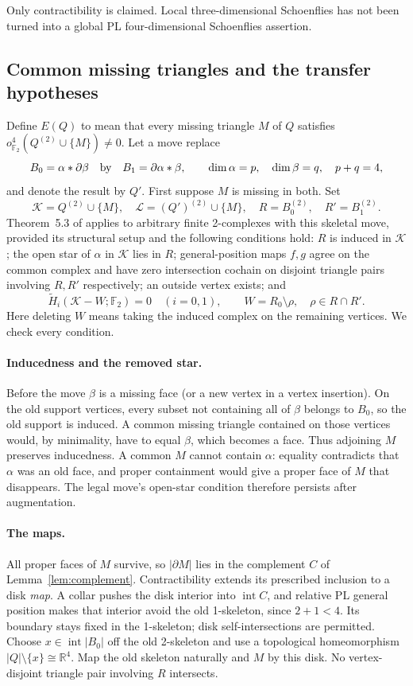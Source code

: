 \documentclass[11pt]{article}
\theoremstyle{remark}
\newcommand{\F}{\mathbb F}
\newcommand{\R}{\mathbb R}
\newcommand{\interior}{\operatorname{int}}
\newcommand{\vk}{o^4_{\F_2}}
\begin{document}
Only contractibility is claimed. Local three-dimensional Schoenflies
has not been turned into a global PL four-dimensional Schoenflies
assertion.

\subsection{Common missing triangles and the transfer hypotheses}

Define $E(Q)$ to mean that every missing triangle $M$ of $Q$ satisfies
$\vk(Q^{(2)}\cup\{M\})\ne0$. Let a move replace
\[
B_0=\alpha*\partial\beta\quad\hbox{by}\quad
B_1=\partial\alpha*\beta,\qquad
\dim\alpha=p,\quad\dim\beta=q,\quad p+q=4,
\]
and denote the result by $Q'$. First suppose $M$ is missing in both.
Set
\[
\mathcal K=Q^{(2)}\cup\{M\},\quad
\mathcal L=(Q')^{(2)}\cup\{M\},\quad
R=B_0^{(2)},\quad R'=B_1^{(2)}.
\]
Theorem~5.3 of \cite{NW} applies to arbitrary finite 2-complexes with
this skeletal move, provided its structural setup and the following
conditions hold: $R$ is induced in $\mathcal K$; the open star of
$\alpha$ in $\mathcal K$ lies in $R$; general-position maps $f,g$ agree
on the common complex and have zero intersection cochain on disjoint
triangle pairs involving $R,R'$ respectively; an outside vertex exists;
and
\begin{equation}\label{eq:homology}
\widetilde H_i(\mathcal K-W;\F_2)=0\quad(i=0,1),
\qquad W=R_0\setminus\rho,\quad\rho\in R\cap R'.
\end{equation}
Here deleting $W$ means taking the induced complex on the remaining
vertices. We check every condition.

\paragraph{Inducedness and the removed star.}
Before the move $\beta$ is a missing face (or a new vertex in a vertex
insertion). On the old support vertices, every subset not containing
all of $\beta$ belongs to $B_0$, so the old support is induced.
A common missing triangle contained on those vertices would, by
minimality, have to equal $\beta$, which becomes a face. Thus adjoining
$M$ preserves inducedness. A common $M$ cannot contain $\alpha$:
equality contradicts that $\alpha$ was an old face, and proper
containment would give a proper face of $M$ that disappears. The legal
move's open-star condition therefore persists after augmentation.

\paragraph{The maps.}
All proper faces of $M$ survive, so $|\partial M|$ lies in the
complement $C$ of Lemma~\ref{lem:complement}. Contractibility extends
its prescribed inclusion to a disk \emph{map}. A collar pushes the
disk interior into $\interior C$, and relative PL general position
makes that interior avoid the old 1-skeleton, since $2+1<4$. Its
boundary stays fixed in the 1-skeleton; disk self-intersections are
permitted. Choose $x\in\interior|B_0|$ off the old 2-skeleton and use
a topological homeomorphism $|Q|\setminus\{x\}\cong\R^4$. Map the old
skeleton naturally and $M$ by this disk. No vertex-disjoint triangle
pair involving $R$ intersects.
\end{document}
